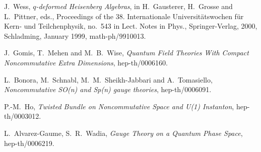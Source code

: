 \documentclass[a4paper,11pt]{article}
\begin{document}
\begin{thebibliography}{99}
 J.~Wess, {\it $q$-deformed Heisenberg Algebras}, in H.~Gausterer,
H.~Grosse and L.~Pittner, eds., Proceedings of the 38. Internationale
Universit\"atswochen f\"ur Kern- und Teilchenphysik, no.\ 543 in Lect. Notes
in Phys., Springer-Verlag, 2000, Schladming, January 1999, math-ph/9910013.

 J.~Gomis, T.~Mehen and M.~B.~Wise, {\it Quantum Field Theories
With Compact Noncommutative Extra Dimensions}, hep-th/0006160.

L.~Bonora, M.~Schnabl, M.~M.~Sheikh-Jabbari and A.~Tomasiello,
{\it Noncommutative SO(n) and Sp(n) gauge theories},
hep-th/0006091.

 P.-M.~Ho, {\it Twisted Bundle on Noncommutative Space and U(1)
Instanton}, hep-th/0003012.

 L.~Alvarez-Gaume, S.~R.~Wadia, {\it Gauge Theory on a 
Quantum Phase Space}, hep-th/0006219.


\end{thebibliography}

\end{document}
